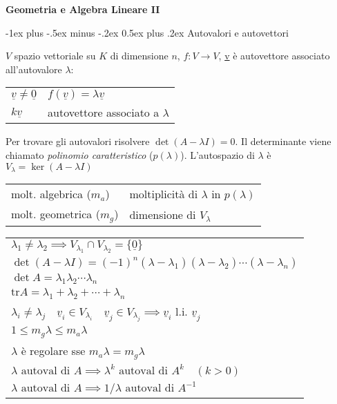 \documentclass[10pt,landscape]{article}
\makeatletter
\renewcommand{\section}{\@startsection{section}{1}{0mm}%
                                {-1ex plus -.5ex minus -.2ex}%
                                {0.5ex plus .2ex}%
                                {\normalfont\large\bfseries}}
\renewcommand{\vec}[1]{\underline{#1}}
\newcommand{\tr}{\mathrm{tr}}
\makeatother
\begin{document}
\raggedright
\footnotesize
\begin{multicols}{3}


\setlength{\premulticols}{1pt}
\setlength{\postmulticols}{1pt}
\setlength{\multicolsep}{1pt}
\setlength{\columnsep}{2pt}

\begin{center}
     \Large{\textbf{Geometria e Algebra Lineare II}} \\
\end{center}

\section{Autovalori e autovettori}

$V$ spazio vettoriale su $K$ di dimensione $n$, $f: V \rightarrow V$, \vec{v} è autovettore associato all'autovalore $\lambda$:
\begin{tabular}{ll}
	$\vec{v} \ne \vec{0}$ & $f(\vec{v}) = \lambda \vec{v}$ \\
	$k\vec{v}$ & autovettore associato a $\lambda$
\end{tabular}

Per trovare gli autovalori risolvere $\det(A-\lambda I) = 0$. Il determinante viene chiamato \emph{polinomio caratteristico} ($p(\lambda)$).
L'autospazio di $\lambda$ è $V_\lambda = \ker(A-\lambda I)$

\begin{tabular}{ll}
	molt. algebrica ($m_a$) & moltiplicità di $\lambda$ in $p(\lambda)$ \\
	molt. geometrica ($m_g$) & dimensione di $V_\lambda$
\end{tabular}

\begin{tabular}{l}
	$\lambda_1 \ne \lambda_2 \implies V_{\lambda_1} \cap V_{\lambda_2} = \{\vec{0}\}$ \\
	$\det(A-\lambda I) = (-1)^n (\lambda - \lambda_1) (\lambda - \lambda_2) \cdots (\lambda - \lambda_n)$ \\
	$\det A = \lambda_1 \lambda_2 \cdots \lambda_n$ \\
	$\tr A = \lambda_1 + \lambda_2 + \cdots + \lambda_n$ \\
	$\lambda_i \ne \lambda_j \quad \vec{v}_i \in V_{\lambda_i} \quad \vec{v}_j \in V_{\lambda_j} \implies \vec{v}_i$ l.i. $\vec{v}_j$ \\
	$1 \le m_g \lambda \le m_a \lambda$ \\
	$\lambda$ è regolare sse $m_a \lambda = m_g \lambda$ \\
	$\lambda \text{ autoval di } A \implies \lambda^k \text{ autoval di } A^k \quad (k > 0)$ \\
	$\lambda \text{ autoval di } A \implies 1/\lambda \text{ autoval di } A^{-1}$
\end{tabular}


\end{multicols}
\end{document}
